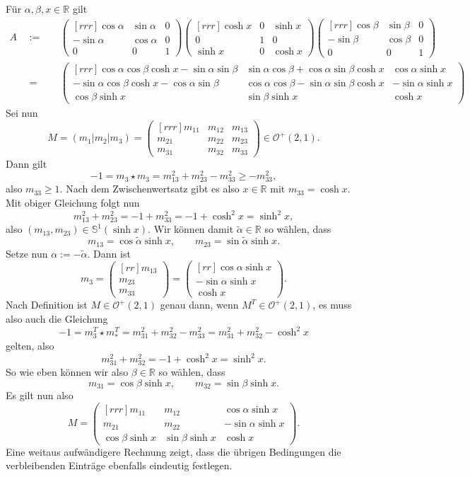 \documentclass[11pt]{book}
\numberwithin{dummy}{section}
\theoremstyle{nonumberbreak}
\newenvironment{prob}[1][]{\ifthenelse{\equal{#1}{}}{\problem}{\problem[#1]}\rm}{\endproblem}
\newenvironment{sol}[1][]{\ifthenelse{\equal{#1}{}}{\solution}{\solution[#1]}\rm}{\endsolution}
\newcommand{\R}{\mathbb{R}}
\newcommand{\Sph}{\mathbb{S}}
\newcommand{\Matx}[9]{\begin{pmatrix}[rrr]#1 & #2 & #3 \\ #4 & #5 & #6 \\ #7 & #8 & #9 \end{pmatrix}}
\newcommand{\Vecdr}[3]{\begin{pmatrix}[rr] #1 \\ #2 \\ #3 \end{pmatrix}}
\begin{document}
\begin{spacing}{1.4}
\begin{prob}
\begin{sol}
\begin{compactenum}
\item Für $\alpha, \beta,x \in \R$ gilt 
\begin{alignat*}{5}
A\ \ &:=&& \ \ \Matx{\cos \alpha}{\sin \alpha}{0}{-\sin \alpha}{\cos \alpha}{0}{0}{0}{1} \Matx{\cosh x}{0}{\sinh x}{0}{1}{0}{\sinh x}{0}{\cosh x} \Matx{\cos \beta}{\sin \beta}{0}{-\sin \beta}{\cos \beta}{0}{0}{0}{1} \\
&=&& \ \ \Matx{\cos \alpha \cos \beta \cosh x - \sin \alpha \sin \beta}{\sin \alpha \cos \beta + \cos \alpha  \sin \beta \cosh x}{\cos \alpha \sinh x}{-\sin \alpha \cos \beta \cosh x - \cos \alpha \sin \beta}{\cos \alpha \cos \beta - \sin \alpha \sin \beta \cosh x}{-\sin \alpha \sinh x}{\cos \beta \sinh x}{\sin \beta \sinh x}{\cosh x}
\end{alignat*}
Sei nun $$M=(m_1\vert m_2 \vert m_3)= \Matx{m_{11}}{m_{12}}{m_{13}}{m_{21}}{m_{22}}{m_{23}}{m_{31}}{m_{32}}{m_{33}} \in \mathcal{O}^+(2,1).$$
Dann gilt
$$-1=m_3 \star m_3 = m_{13}^2+m_{23}^2 -m_{33}^2 \geqslant - m_{33}^2,$$
also $m_{33} \geqslant 1$. Nach dem Zwischenwertsatz gibt es also $x \in \R$ mit $m_{33}=\cosh x$. Mit obiger Gleichung folgt nun 
$$m_{13}^2+m_{23}^2 = -1 + m_{33}^2 = -1+ \cosh^2x = \sinh^2x,$$
also $(m_{13}, m_{23}) \in \Sph^1(\sinh x)$. Wir können damit $\tilde{\alpha} \in \R$ so wählen, dass 
$$m_{13}= \cos \tilde{\alpha} \sinh x, \qquad m_{23}= \sin \tilde{\alpha} \sinh x.$$
Setze nun $\alpha:=-\tilde{\alpha}$. Dann ist
$$m_3 = \Vecdr{m_{13}}{m_{23}}{m_{33}} = \Vecdr{\cos \alpha \sinh x}{- \sin \alpha \sinh x}{\cosh x}.$$
Nach Definition ist $M \in \mathcal{O}^+(2,1)$ genau dann, wenn $M^T \in \mathcal{O}^+(2,1)$, es muss also auch die Gleichung
$$-1= m^T_3 \star m^T_* = m_{31}^2 + m_{32}^2 - m_{33}^2 = m_{31}^2 + m_{32}^2 - \cosh^2x$$
gelten, also 
$$m_{31}^2 + m_{32}^2 = -1 + \cosh^2x = \sinh^2x.$$
So wie eben können wir also $\beta \in \R$ so wählen, dass 
$$m_{31} = \cos \beta \sinh x, \qquad m_{32} = \sin \beta \sinh x.$$
Es gilt nun also 
$$M=\Matx{m_{11}}{m_{12}}{\cos \alpha \sinh x}{m_{21}}{m_{22}}{-\sin \alpha \sinh x}{\cos \beta \sinh x}{\sin \beta \sinh x}{\cosh x}.$$
Eine weitaus aufwändigere Rechnung zeigt, dass die übrigen Bedingungen die verbleibenden Einträge ebenfalls eindeutig festlegen.



\end{compactenum}
\end{sol}
\end{prob}
\end{spacing}
\end{document}
